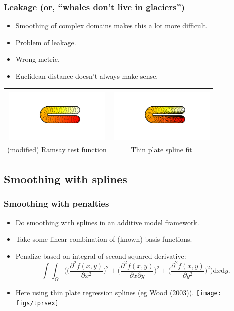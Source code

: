 \documentclass[ignorenonframetext]{beamer} %
\newcommand{\bc}{\begin{center}}
\newcommand{\ec}{\end{center}}
\newcommand{\bi}{\begin{itemize}}
\newcommand{\ei}{\end{itemize}}
\begin{document}
\begin{frame}
	\frametitle{Leakage (or, ``whales don't live in glaciers'')}
       \bi
         \item Smoothing of complex domains makes this a lot more difficult.
         \item Problem of leakage.
         \item Wrong metric.
         \item Euclidean distance doesn't always make sense.
       \ei
       \bc\begin{tabular}{@{}cc}
          & \\
          \includegraphics[width=2in, trim=1in 1in 1in 1in]{figs/ramsayhorseshoe} & \includegraphics[width=2in, trim=1in 1in 1in 1in]{figs/leakageexample}\\
          (modified) Ramsay test function & Thin plate spline fit\\
       \end{tabular}\ec
\end{frame}

\subsection{Smoothing with splines}

\begin{frame}
	\frametitle{Smoothing with penalties}
      \bi
        \item Do smoothing with splines in an additive model framework.
        \item Take some linear combination of (known) basis functions.
        \item Penalize based on integral of second squared derivative:
            \begin{equation*}
	            \int\int_\Omega \Big( \Big(\frac{\partial^2 f(x,y)}{\partial x^2}\Big)^2 + \Big(\frac{\partial^2 f(x,y)}{\partial x \partial y}\Big)^2 + \Big(\frac{\partial^2 f(x,y)}{\partial y^2}\Big)^2\Big) \text{d}x\text{d}y.
            \end{equation*}
        \item Here using thin plate regression splines (eg Wood (2003)).
        \texttt{[image: figs/tprsex]} 
      \ei
\end{frame}
\end{document}
